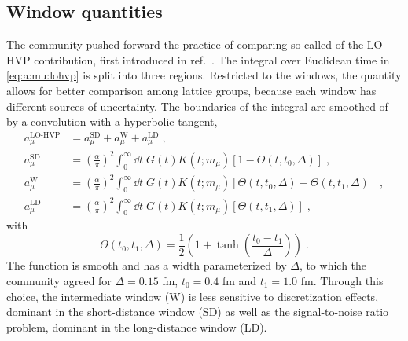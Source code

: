 \subsection{Window quantities}

\label{sec:intro:gm2:windows}

The community pushed forward the practice of comparing so called  of the LO-HVP contribution, first introduced in ref.~\cite{RBC_2018}.
The integral over Euclidean time in \cref{eq:a:mu:lohvp} is split into three regions.
Restricted to the windows, the quantity allows for better comparison among lattice groups, because each window has different sources of uncertainty.
The boundaries of the integral are smoothed of by a convolution with a hyperbolic tangent,
\begin{align} \label{eq:a:mu:lohvp:windows}
a_{\mu}^{\text{LO-HVP}} &= a_{\mu}^{\text{SD}} + a_{\mu}^{\text{W}} + a_{\mu}^{\text{LD}} \;, \\
a_{\mu}^{\text{SD}} &=
\left( \frac{\alpha}{\pi} \right)^{2} \int_{0}^{\infty} \dd t \; G(t) K(t; m_{\mu}) \left[ 1 - \Theta(t, t_0, \Delta) \right] \;, \\
a_{\mu}^{\text{W}} &=
\left( \frac{\alpha}{\pi} \right)^{2} \int_{0}^{\infty} \dd t \; G(t) K(t; m_{\mu}) \left[ \Theta(t, t_0, \Delta) - \Theta(t, t_1, \Delta) \right] \;, \\
a_{\mu}^{\text{LD}} &=
\left( \frac{\alpha}{\pi} \right)^{2} \int_{0}^{\infty} \dd t \; G(t) K(t; m_{\mu}) \left[ \Theta(t, t_1, \Delta) \right] \;,
\end{align}
with
\begin{equation}
\Theta(t_0, t_1, \Delta) = \frac{1}{2} \left( 1 + \tanh\left( \frac{t_0 - t_1}{\Delta} \right) \right) \;.
\end{equation}
The function is smooth and has a width parameterized by $\Delta$, to which the community agreed for $\Delta = 0.15$ fm, $t_0 = 0.4$ fm and $t_1 = 1.0$ fm.
Through this choice, the intermediate window (W) is less sensitive to discretization effects, dominant in the short-distance window (SD) as well as the signal-to-noise ratio problem, dominant in the long-distance window (LD).
























